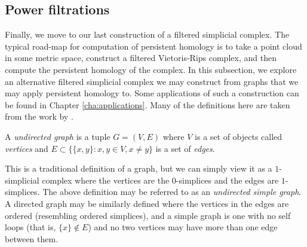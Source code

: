 \subsection{Power filtrations}

Finally, we move to our last construction of a filtered simplicial complex. The typical road-map for computation of persistent homology is to take a point cloud in some metric space, construct a filtered Vietoris-Rips complex, and then compute the persistent homology of the complex. In this subsection, we explore an alternative filtered simplicial complex we may construct from graphs that we may apply persistent homology to. Some applications of such a construction can be found in Chapter \ref{cha:applications}. Many of the definitions here are taken from the work by \textcite{ferri2018simplicial}.

\begin{definition}[Graph]
    A \emph{undirected graph} is a tuple $G = (V,E)$ where $V$ is a set of objects called \emph{vertices} and $E \subset \{\{x,y\}: x,y \in V, x \neq y\}$ is a set of \emph{edges}.
\end{definition}

This is a traditional definition of a graph, but we can simply view it as a $1$-simplicial complex where the vertices are the $0$-simplices and the edges are $1$-simplices. The above definition may be referred to as an \emph{undirected simple graph}. A directed graph may be similarly defined where the vertices in the edges are ordered (resembling ordered simplices), and a simple graph is one with no self loops (that is, $\{x\} \not\in E$) and no two vertices may have more than one edge between them.

